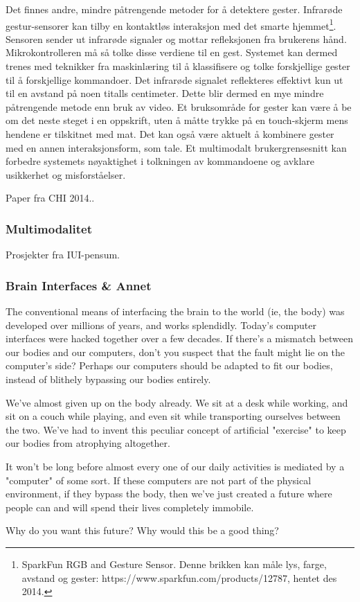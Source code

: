 {Det finnes andre, mindre påtrengende metoder for å detektere gester. Infrarøde gestur-sensorer kan tilby en kontaktløs interaksjon med det smarte hjemmet\footnote{SparkFun RGB and Gesture Sensor. Denne brikken kan måle lys, farge, avstand og gester: https://www.sparkfun.com/products/12787, hentet des 2014.}. Sensoren sender ut infrarøde signaler og mottar refleksjonen fra brukerens hånd. Mikrokontrolleren må så tolke disse verdiene til en gest. Systemet kan dermed trenes med teknikker fra maskinlæring til å klassifisere og tolke forskjellige gester til å forskjellige kommandoer. Det infrarøde signalet reflekteres effektivt kun ut til en avstand på noen titalls centimeter. Dette blir dermed en mye mindre påtrengende metode enn bruk av video. Et bruksområde for gester kan være å be om det neste steget i en oppskrift, uten å måtte trykke på en touch-skjerm mens hendene er tilskitnet med mat. Det kan også være aktuelt å kombinere gester med en annen interaksjonsform, som tale. Et multimodalt brukergrensesnitt kan forbedre systemets nøyaktighet i tolkningen av kommandoene og avklare usikkerhet og misforståelser.

Paper fra CHI 2014..
}

\subsubsection*{Multimodalitet}
{\color{blue}
Prosjekter fra IUI-pensum.

}


\subsubsection*{Brain Interfaces \& Annet}
{\color{blue}
The conventional means of interfacing the brain to the world (ie, the body) was developed over millions of years, and works splendidly. Today's computer interfaces were hacked together over a few decades. If there's a mismatch between our bodies and our computers, don't you suspect that the fault might lie on the computer's side? Perhaps our computers should be adapted to fit our bodies, instead of blithely bypassing our bodies entirely.

We've almost given up on the body already. We sit at a desk while working, and sit on a couch while playing, and even sit while transporting ourselves between the two. We've had to invent this peculiar concept of artificial "exercise" to keep our bodies from atrophying altogether.

It won't be long before almost every one of our daily activities is mediated by a "computer" of some sort. If these computers are not part of the physical environment, if they bypass the body, then we've just created a future where people can and will spend their lives completely immobile.

Why do you want this future? Why would this be a good thing?
}


